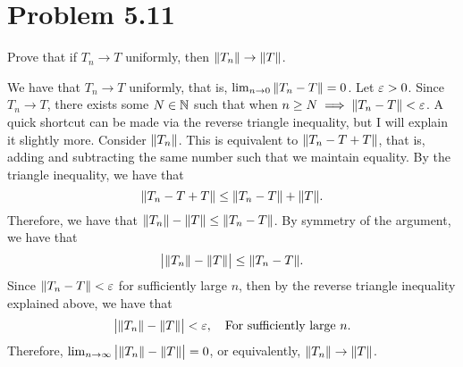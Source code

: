 \newpage
\section{Problem 5.11}
Prove that if $T_n \rightarrow T$ uniformly, then $\norm{T_n} \rightarrow \norm{T}$.
\partbreak
\begin{solution}

    We have that $T_n \rightarrow T$ uniformly, that is, $\lim_{n \rightarrow 0} \norm{T_n - T} = 0$. Let $\varepsilon > 0$. Since $T_n \rightarrow T$, there exists some $N \in \mathbb{N}$ such that when $n \geq N \implies \norm{T_n - T} < \varepsilon$. A quick shortcut can be made via the reverse triangle inequality, but I will explain it slightly more. Consider $\norm{T_n}$. This is equivalent to $\norm{T_n - T + T}$, that is, adding and subtracting the same number such that we maintain equality. By the triangle inequality, we have that 
    \[\norm{T_n - T + T} \leq \norm{T_n - T} + \norm{T}.\]
    Therefore, we have that $\norm{T_n} - \norm{T} \leq \norm{T_n - T}$. By symmetry of the argument, we have that 
    \[\big|\norm{T_n} - \norm{T}\big| \leq \norm{T_n - T}.\]
    Since $\norm{T_n - T} < \varepsilon$ for sufficiently large $n$, then by the reverse triangle inequality explained above, we have that 
    \[\big| \norm{T_n} - \norm{T} \big| < \varepsilon, \quad \text{For sufficiently large $n$.}\]
    Therefore, $\lim_{n\rightarrow\infty} \big|\norm{T_n} - \norm{T}\big| = 0$, or equivalently, $\norm{T_n} \rightarrow \norm{T}$.
\end{solution}
\newpage
